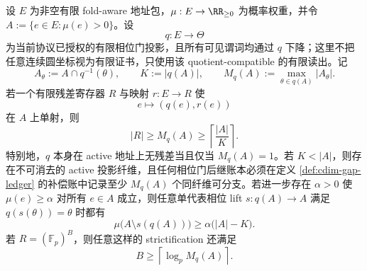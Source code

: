 \begin{theorem}[亚临界相位门的有限剩余纤维正规形]\label{distill:gromov-dimension_waist_projection_families-cdim-subcritical-phase-gate-residual-ledger}
设 \(E\) 为非空有限 fold-aware 地址包，\(\mu:E\to\RR_{\ge0}\) 为概率权重，并令 \(A:=\{e\in E:\mu(e)>0\}\)。设
\[
q:E\longrightarrow \Theta
\]
为当前协议已授权的有限相位门投影，且所有可见谓词均通过 \(q\) 下降；这里不把任意连续圆坐标视为有限证书，只使用该 quotient-compatible 的有限读出。记
\[
A_\theta:=A\cap q^{-1}(\theta),\qquad
K:=|q(A)|,\qquad
M_q(A):=\max_{\theta\in q(A)}|A_\theta|.
\]
若一个有限残差寄存器 \(R\) 与映射 \(r:E\to R\) 使
\[
e\longmapsto (q(e),r(e))
\]
在 \(A\) 上单射，则
\[
|R|\ge M_q(A)\ge \left\lceil \frac{|A|}{K}\right\rceil .
\]
特别地，\(q\) 本身在 active 地址上无残差当且仅当 \(M_q(A)=1\)。若 \(K<|A|\)，则存在不可消去的 active 投影纤维，且任何相位门后继账本必须在定义 \ref{def:cdim-gap-ledger} 的补偿账中记录至少 \(M_q(A)\) 个同纤维可分支。若进一步存在 \(\alpha>0\) 使 \(\mu(e)\ge\alpha\) 对所有 \(e\in A\) 成立，则任意单代表相位 lift \(s:q(A)\to A\) 满足 \(q(s(\theta))=\theta\) 时都有
\[
\mu\bigl(A\setminus s(q(A))\bigr)
\ge \alpha\bigl(|A|-K\bigr).
\]
若 \(R=(\mathbb F_p)^B\)，则任意这样的 strictification 还满足
\[
B\ge \left\lceil \log_p M_q(A)\right\rceil .
\]
\end{theorem}

